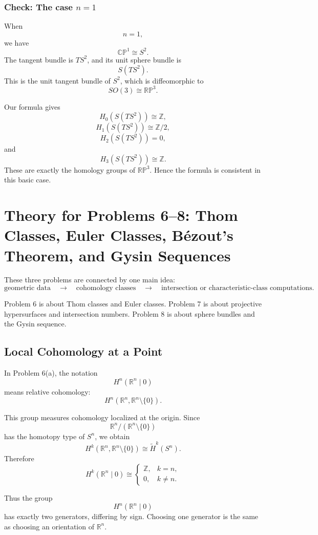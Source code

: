 \documentclass[12pt,a4paper]{article}
\theoremstyle{notespace}
\begin{document}
\subsubsection*{Check: The case \(n=1\)}

When
\[
n=1,
\]
we have
\[
\mathbb{CP}^1\cong S^2.
\]
The tangent bundle is \(TS^2\), and its unit sphere bundle is
\[
S(TS^2).
\]
This is the unit tangent bundle of \(S^2\), which is diffeomorphic to
\[
SO(3)\cong \mathbb{RP}^3.
\]

Our formula gives
\[
H_0(S(TS^2))\cong \mathbb Z,
\]
\[
H_1(S(TS^2))\cong \mathbb Z/2,
\]
\[
H_2(S(TS^2))=0,
\]
and
\[
H_3(S(TS^2))\cong \mathbb Z.
\]
These are exactly the homology groups of \(\mathbb{RP}^3\). Hence the formula is
consistent in this basic case.	
	
\section{Theory for Problems 6--8: Thom Classes, Euler Classes, B\'ezout's Theorem, and Gysin Sequences}

These three problems are connected by one main idea:
\[
\text{geometric data}
\quad\longrightarrow\quad
\text{cohomology classes}
\quad\longrightarrow\quad
\text{intersection or characteristic-class computations}.
\]

Problem 6 is about Thom classes and Euler classes. Problem 7 is about
projective hypersurfaces and intersection numbers. Problem 8 is about sphere
bundles and the Gysin sequence.

\subsection{Local Cohomology at a Point}

In Problem 6(a), the notation
\[
H^n(\mathbb R^n\mid 0)
\]
means relative cohomology:
\[
H^n(\mathbb R^n,\mathbb R^n\setminus\{0\}).
\]

This group measures cohomology localized at the origin. Since
\[
\mathbb R^n/(\mathbb R^n\setminus\{0\})
\]
has the homotopy type of \(S^n\), we obtain
\[
H^k(\mathbb R^n,\mathbb R^n\setminus\{0\})
\cong
\widetilde H^k(S^n).
\]
Therefore
\[
H^k(\mathbb R^n\mid 0)
\cong
\begin{cases}
	\mathbb Z, & k=n,\\
	0, & k\neq n.
\end{cases}
\]

Thus the group
\[
H^n(\mathbb R^n\mid 0)
\]
has exactly two generators, differing by sign. Choosing one generator is the same
as choosing an orientation of \(\mathbb R^n\).
\end{document}
